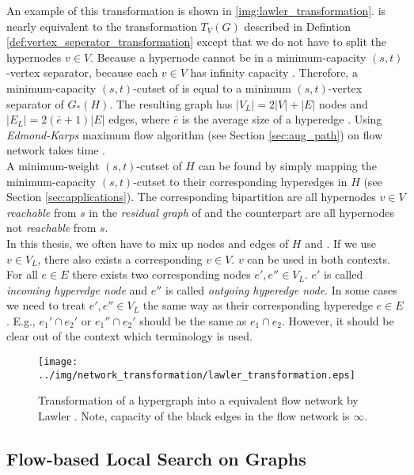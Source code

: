An example of this transformation is shown in \autoref{img:lawler_transformation}.
 is nearly equivalent to the transformation $T_V(G)$ described in Defintion \autoref{def:vertex_seperator_transformation}
except that we do not have to split the hypernodes $v \in V$. Because
a hypernode cannot be in a minimum-capacity $(s,t)$-vertex separator, because each $v \in V$ has
infinity capacity \cite{HuMoerder85}. Therefore, a minimum-capacity $(s,t)$-cutset 
of  is equal to a minimum $(s,t)$-vertex separator of $G_*(H)$.
The resulting graph  has $|V_L| = 2|V| + |E|$ nodes and $|E_L| = 2(\bar{e}+1)|E|$ edges, where
$\bar{e}$ is the average size of a hyperedge \cite{pistorius2003}. Using \emph{Edmond-Karps}
maximum flow algorithm (see Section \ref{sec:aug_path}) on flow network  
takes time  \cite{lawler1973}. \\
A minimum-weight $(s,t)$-cutset of $H$ can be found by simply mapping the minimum-capacity
$(s,t)$-cutset to their corresponding hyperedges in $H$ (see Section \ref{sec:applications}). 
The corresponding bipartition are all hypernodes $v \in V$ \emph{reachable} from $s$ in the 
\emph{residual graph} of  and the counterpart are all hypernodes not \emph{reachable}
from $s$. \\ 
In this thesis, we often have to mix up nodes and edges of $H$ and . If we use
$v \in V_L$, there also exists a corresponding $v \in V$. $v$ can be used in both contexts.
For all $e \in E$ there exists two corresponding nodes $e',e'' \in V_L$. $e'$ 
is called \emph{incoming hyperedge node} and $e''$ is called \emph{outgoing hyperedge node}. 
In some cases we need to treat $e',e'' \in V_L$ the same way as their corresponding 
hyperedge $e \in E$. E.g., $e_1' \cap e_2'$ or $e_1'' \cap e_2'$ should be the same as $e_1 \cap e_2$.
However, it should be clear out of the context which terminology is used.


\begin{figure}
\centering
\texttt{[image: ../img/network\_transformation/lawler\_transformation.eps]}
\caption{Transformation of a hypergraph into a equivalent flow network by Lawler \cite{lawler1973}. Note,
capacity of the black edges in the flow network is $\infty$.}
\label{img:lawler_transformation}
\end{figure}


\subsection{Flow-based Local Search on Graphs}
\label{sec:flow_local_search_graph}

